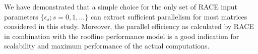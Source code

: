 We have demonstrated that a simple choice for the only set of RACE input
parameters $\{\epsilon_s; s=0,1,\ldots\}$ can extract sufficient parallelism for
most matrices considered in this study. Moreover, the parallel efficiency as
calculated by RACE in combination with the roof{}line performance model is a good
indication for scalability and maximum performance of the actual computations.

